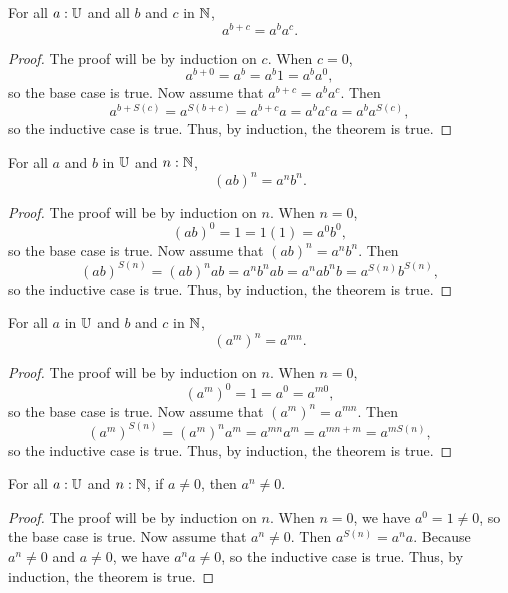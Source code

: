 \documentclass[../../math.tex]{subfiles}
\begin{document}
\begin{theorem}
    For all $a : \mathbb{U}$ and all $b$ and $c$ in $\mathbb{N}$,
    \[
        a^{b + c} = a^b a^c.
    \]
\end{theorem}
\begin{proof}
    The proof will be by induction on $c$.  When $c = 0$,
    \[
        a^{b + 0} = a^b = a^b1 = a^ba^0,
    \]
    so the base case is true.  Now assume that $a^{b + c} = a^b a^c$.  Then
    \[
        a^{b + S(c)} = a^{S(b + c)} = a^{b + c}a = a^b a^c a = a^b a^{S(c)},
    \]
    so the inductive case is true.  Thus, by induction, the theorem is true.
\end{proof}

\begin{theorem}
    For all $a$ and $b$ in $\mathbb{U}$ and $n : \mathbb{N}$,
    \[
        (ab)^n = a^nb^n.
    \]
\end{theorem}
\begin{proof}
    The proof will be by induction on $n$.  When $n = 0$,
    \[
        (ab)^0 = 1 = 1(1) = a^0b^0,
    \]
    so the base case is true.  Now assume that $(ab)^n = a^nb^n$.  Then
    \[
        (ab)^{S(n)} = (ab)^n ab = a^n b^n a b = a^n a b^n b = a^{S(n)} b^{S(n)},
    \]
    so the inductive case is true.  Thus, by induction, the theorem is true.
\end{proof}

\begin{theorem}
    For all $a$ in $\mathbb{U}$ and $b$ and $c$ in $\mathbb{N}$,
    \[
        (a^m)^n = a^{mn}.
    \]
\end{theorem}
\begin{proof}
    The proof will be by induction on $n$.  When $n = 0$,
    \[
        (a^m)^0 = 1 = a^0 = a^{m0},
    \]
    so the base case is true.  Now assume that $(a^m)^n = a^{mn}$.  Then
    \[
        (a^m)^{S(n)} = (a^m)^n a^m = a^{mn} a^m = a^{mn + m} = a^{mS(n)},
    \]
    so the inductive case is true.  Thus, by induction, the theorem is true.
\end{proof}

\begin{theorem} \label{nat_pow_not_zero}
    For all $a : \mathbb{U}$ and $n : \mathbb{N}$, if $a \neq 0$, then $a^n \neq 0$.
\end{theorem}
\begin{proof}
    The proof will be by induction on $n$.  When $n = 0$, we have $a^0 = 1 \neq
    0$, so the base case is true.  Now assume that $a^n \neq 0$.  Then $a^{S(n)}
    = a^na.$  Because $a^n \neq 0$ and $a \neq 0$, we have $a^na \neq 0$, so the
    inductive case is true.  Thus, by induction, the theorem is true.
\end{proof}
\end{document}
